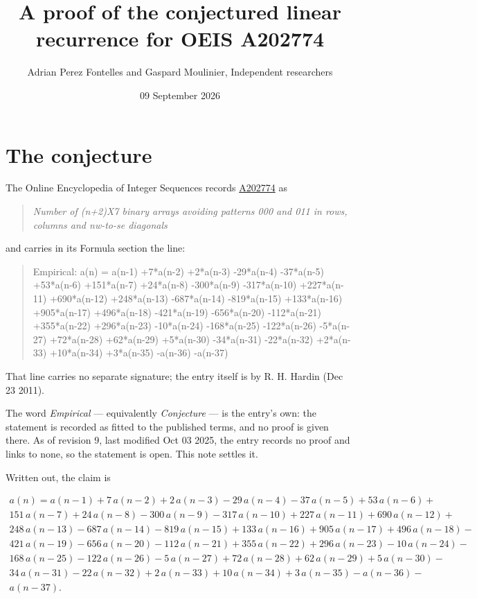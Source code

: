 \documentclass[11pt]{article}
\title{A proof of the conjectured linear recurrence for OEIS A202774}
\author{Adrian Perez Fontelles and Gaspard Moulinier, Independent researchers}
\date{09 September 2026}
\theoremstyle{definition}
\begin{document}
\maketitle
\section{The conjecture}

The Online Encyclopedia of Integer Sequences records \href{https://oeis.org/A202774}{A202774} as

\begin{quote}\itshape Number of (n+2)X7 binary arrays avoiding patterns 000 and 011 in rows, columns and nw-to-se diagonals\end{quote}

and carries in its Formula section the line:

\begin{quote}\ttfamily Empirical: a(n) = a(n-1) +7*a(n-2) +2*a(n-3) -29*a(n-4) -37*a(n-5) +53*a(n-6) +151*a(n-7) +24*a(n-8) -300*a(n-9) -317*a(n-10) +227*a(n-11) +690*a(n-12) +248*a(n-13) -687*a(n-14) -819*a(n-15) +133*a(n-16) +905*a(n-17) +496*a(n-18) -421*a(n-19) -656*a(n-20) -112*a(n-21) +355*a(n-22) +296*a(n-23) -10*a(n-24) -168*a(n-25) -122*a(n-26) -5*a(n-27) +72*a(n-28) +62*a(n-29) +5*a(n-30) -34*a(n-31) -22*a(n-32) +2*a(n-33) +10*a(n-34) +3*a(n-35) -a(n-36) -a(n-37)\end{quote}

That line carries no separate signature; the entry itself is by R. H. Hardin (Dec 23 2011).

The word {\itshape Empirical} --- equivalently {\itshape Conjecture} --- is the entry's own: the statement is recorded as fitted to the published terms, and no proof is given there. As of revision 9, last modified Oct 03 2025, the entry records no proof and links to none, so the statement is open. This note settles it.

Written out, the claim is

\begin{multline*} a(n) = a(n-1) + 7\,a(n-2) + 2\,a(n-3) - 29\,a(n-4) - 37\,a(n-5) + 53\,a(n-6) + \\ 151\,a(n-7) + 24\,a(n-8) - 300\,a(n-9) - 317\,a(n-10) + 227\,a(n-11) + 690\,a(n-12) + \\ 248\,a(n-13) - 687\,a(n-14) - 819\,a(n-15) + 133\,a(n-16) + 905\,a(n-17) + 496\,a(n-18) - \\ 421\,a(n-19) - 656\,a(n-20) - 112\,a(n-21) + 355\,a(n-22) + 296\,a(n-23) - 10\,a(n-24) - \\ 168\,a(n-25) - 122\,a(n-26) - 5\,a(n-27) + 72\,a(n-28) + 62\,a(n-29) + 5\,a(n-30) - \\ 34\,a(n-31) - 22\,a(n-32) + 2\,a(n-33) + 10\,a(n-34) + 3\,a(n-35) - a(n-36) - \\ a(n-37). \end{multline*}
\end{document}
